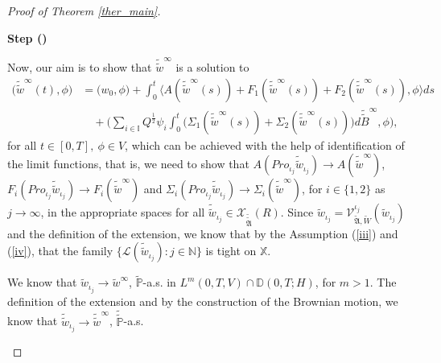 \documentclass[english,a4paper,11pt]{amsart}
\theoremstyle{plain}
\theoremstyle{definition}
\theoremstyle{remark}
\numberwithin{equation}{section}
\newcounter{lil1}
\newenvironment{step}
{\begin{list} { \bf Step (\Roman{lil1})}
		{ \usecounter{lil1}
			\setlength{\leftmargin}{0.0cm}
			\setlength{\topsep}{0.2cm}
			\setlength{\itemsep}{0.0cm}
			\setlength{\parsep}{0.1cm}
			\setlength{\itemindent}{0.8cm}
			\setlength{\parskip}{0.0cm}}}
	{\end{list}}
\newcounter{lil33}
\newcounter{lil1q}
\newcommand{\MA}{\mathfrak{A}}
\newcommand{\wi}[1]{{\widetilde{#1}}}
\def\wi{\widetilde}
\newcommand{\la}{\langle}
\newcommand{\ra}{\rangle}
\newcommand{\PP}{{\mathbb{P}}}
\newcommand{\N}{\mathbb{N}}
\newcommand{\Pro}{Pro}
\begin{document}
\begin{proof}[Proof of Theorem \ref{ther_main}]
\begin{step}
\newcommand{\wwwt}{\widetilde{\widetilde{w} }}
\newcommand{\wwi}[1]{\widetilde{\widetilde{#1}}}

Now, our aim is to show that 
$\widetilde{\widetilde{w}}^\infty $ is a solution to 
\begin{align*}
	\big( {\wwwt}^\infty (t),\phi \big) 
	&=\big( w_0,\phi \big)+\int_{0}^{t}
\big\la 	A( {\wwwt}^\infty (s))+F_1({\wwwt}^\infty(s))+F_2({\wwwt}^\infty(s))  
,\phi\big\ra ds  
	\\&\quad  +\Big(\sum_{i\in \mathbb{I}}Q^{\frac{1}{2}}{\psi_i}  \int_0^t \big(\Sigma_1({\wwwt}^\infty(s))+\Sigma_2({\wwwt}^\infty(s))\big) d\wi{\widetilde B}^\infty ,\phi\Big),
\end{align*}for all $t\in[0,T], \ \phi\in V$, which can be achieved with the help of identification of the limit functions, that is, we need to show that $A(\Pro_{\iota_j}\widetilde{\widetilde{w}}_{\iota_j}) \to A(\wi{\wi{w}}^\infty)$, $F_i(\Pro_{\iota_j}\wi{\wi{w}}_{\iota_j}) \to F_i(\wi{\wi{w}}^\infty)$ and $\Sigma_i(\Pro_{\iota_j}\wi{\wi{w}}_{\iota_j}) \to \Sigma_i(\wi{\wi{w}}^\infty)$, for $i\in\{1,2\}$ as $j\to\infty$, in the appropriate spaces  for all   $\wi{\wi{w}}_{
{\iota_j}}\in\mathcal{X}_{\wwi{\MA}}(R)$.
%
 Since  $\wi{w}_{{\iota_j}}=\mathcal{V}^{\iota_j}_{\wi{\MA},\wi{W}}(\wi{w}_{{\iota_j}})$ and the definition of the extension, we know that by the Assumption (\ref{iii}) and (\ref{iv}), that the family $\{\mathscr{L}(\wwi{w}_{{\iota_j}}):j\in\N\}$ is tight on $\mathbb{X}$. 
 

%
We know that $\wi{w}_{{\iota_j}}\to\wi{w}^\infty$, $\wi{\PP}$-a.s. in ${L^m(0,T,V)}\cap \mathbb{D}(0,T;H)$, for $m>1$. The definition of the extension and by the construction of the Brownian motion, we know that 
 $\wwi{w}_{{\iota_j}}\to\wwi{w}^\infty$, $\wwi{\PP}$-a.s.
 

\end{step}
\end{proof}
\end{document}

